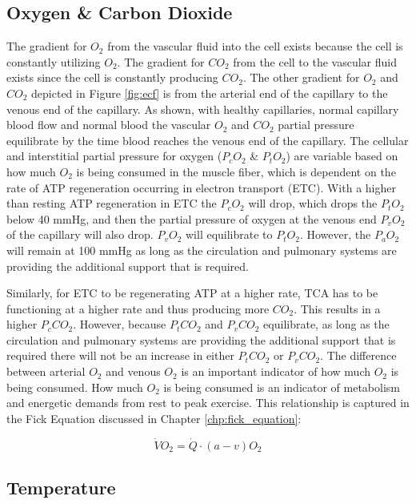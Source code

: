 \subsection{Oxygen \& Carbon Dioxide}

The gradient for $O_2$ from the vascular fluid into the cell exists because the cell is constantly utilizing $O_2$. The gradient for $CO_2$ from the cell to the vascular fluid exists since the cell is constantly producing $CO_2$. The other gradient for $O_2$ and $CO_2$ depicted in Figure \ref{fig:ecf} is from the arterial end of the capillary to the venous end of the capillary. As shown, with healthy capillaries, normal capillary blood flow and normal blood the vascular $O_2$ and $CO_2$ partial pressure equilibrate by the time blood reaches the venous end of the capillary. The cellular and interstitial partial pressure for oxygen ($P_c O_2$ \& $P_t O_2$) are variable based on how much $O_2$ is being consumed in the muscle fiber, which is dependent on the rate of ATP regeneration occurring in electron transport (ETC). With a higher than resting ATP regeneration in ETC the $P_c O_2$ will drop, which drops the $P_t O_2$ below 40 mmHg, and then the partial pressure of oxygen at the venous end $P_v O_2$ of the capillary will also drop. $P_v O_2$ will equilibrate to $P_t O_2$. However, the $P_a O_2$ will remain at 100 mmHg as long as the circulation and pulmonary systems are providing the additional support that is required.

Similarly, for ETC to be regenerating ATP at a higher rate, TCA has to be functioning at a higher rate and thus producing more $CO_2$. This results in a higher $P_c CO_2$. However, because $P_t CO_2$ and $P_v CO_2$ equilibrate, as long as the circulation and pulmonary systems are providing the additional support that is required there will not be an increase in either $P_t CO_2$ or $P_v CO_2$. The difference between arterial $O_2$ and venous $O_2$ is an important indicator of how much $O_2$ is being consumed. How much $O_2$ is being consumed is an indicator of metabolism and energetic demands from rest to peak exercise. This relationship is captured in the Fick Equation discussed in Chapter \ref{chp:fick_equation}:

\begin{equation}
    \dot{V}O_2 = \dot{Q} \cdot (a-v)O_2
    \label{FicksEquation}
\end{equation}


\subsection{Temperature}

